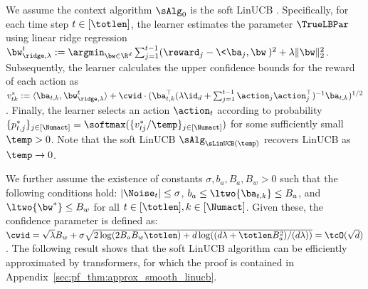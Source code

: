 \documentclass[10pt]{article}
\newcommand{\authnote}[2]{{\scriptsize $\ll$\textsf{#1 notes: #2}$\gg$}}
\newcommand{\authnote}[2]{}
\newcommand{\lc}[1]{{\color{blue}\authnote{Licong}{#1}}}
\begin{document}
We assume the context algorithm $\sAlg_0$ is the soft LinUCB \citep{chu2011contextual}. Specifically, for each time step $t\in[\totlen]$, the learner estimates the parameter $\TrueLBPar$ using linear ridge regression $\bw^t_{\ridge,\lambda}:=\argmin_{\bw\in\R^d} \sum_{j=1}^{t-1}(\reward_j-\<\ba_j,\bw\>)^2+ \lambda \|\bw\|_2^2$. Subsequently, the learner calculates the upper confidence bounds for the reward of each action as $v^*_{tk}:=\langle \ba_{t,k},\bw^t_{\ridge,\lambda}\rangle +\cwid \cdot (\ba_{t,k}^\top (\lambda\id_d+\sum_{j=1}^{t-1}\action_j\action_j^\top)^{-1}  \ba_{t,k})^{1/2}$. Finally, the learner selects an action $\action_t$ according to probability $\{ p^*_{t,j} \}_{j \in [\Numact]} = \softmax(\{v^*_{tj}/\temp \}_{j \in [\Numact]})$ for some sufficiently small $\temp>0$. Note that the soft LinUCB $\sAlg_{\sLinUCB(\temp)}$ recovers LinUCB as $\temp\to 0$. 


We further assume the existence of constants $\sigma,b_a,B_a,B_w>0$ such that the following conditions hold:   $|\Noise_t|\leq\sigma$, $b_a\leq\ltwo{\ba_{t,k}}\leq B_a$, and $\ltwo{\bw^*}\le B_w$ for all $t\in[\totlen],k\in[\Numact]$. Given these, the confidence parameter is defined as: $\cwid=\sqrt{\lambda}B_w+\sigma\sqrt{2\log (2B_aB_w \totlen )+d\log((d\lambda+\totlen B_a^2)/(d\lambda))} = \tcO(\sqrt{d})$. The following result shows that the soft LinUCB algorithm can be efficiently approximated by transformers, for which the proof is contained in Appendix~\ref{sec:pf_thm:approx_smooth_linucb}. 
\end{document}
